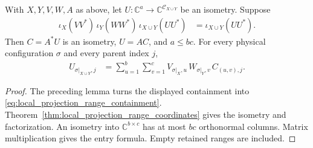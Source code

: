 \begin{theorem}
    \label{thm:local_projection_tensor_coordinates}
    \leanok
    With $X,Y,V,W,A$ as above, let
    $U:\mathbb C^a\to\mathbb C^{\mathcal C_{X\cup Y}}$ be an isometry.
    Suppose
    \begin{align}
        \iota_X(VV^*)\,\iota_Y(WW^*)\,\iota_{X\cup Y}(UU^*)
        &=\iota_{X\cup Y}(UU^*).
        \label{eq:local_tensor_parent_containment}
    \end{align}
    Then $C=A^*U$ is an isometry, $U=AC$, and $a\le bc$.
    For every physical configuration $\sigma$ and every parent index $j$,
    \begin{align}
        U_{\sigma|_{X\cup Y},j}
        &=\sum_{u=1}^b\sum_{v=1}^c
          V_{\sigma|_X,u}\,W_{\sigma|_Y,v}\,C_{(u,v),j}.
        \label{eq:local_tensor_parent_amplitude}
    \end{align}
\end{theorem}
\begin{proof}\leanok
    The preceding lemma turns the displayed containment into
    \eqref{eq:local_projection_range_containment}.
    Theorem~\ref{thm:local_projection_range_coordinates} gives the
    isometry and factorization. An isometry into $\mathbb C^{b\times c}$
    has at most $bc$ orthonormal columns. Matrix multiplication gives
    the entry formula. Empty retained ranges are included.
\end{proof}
